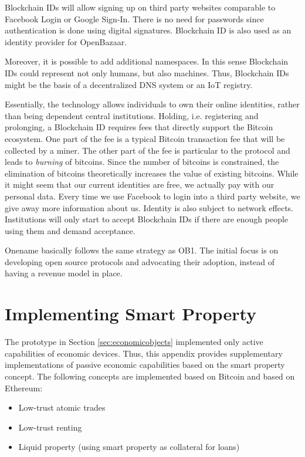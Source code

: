 Blockchain IDs will allow signing up on third party websites comparable to Facebook 
Login or Google Sign-In. There is no need for passwords since authentication is 
done using digital signatures. Blockchain ID is also used as an identity provider 
for OpenBazaar. 

Moreover, it is possible to add additional namespaces. In this sense Blockchain 
IDs could represent not only humans, but also machines. Thus, Blockchain IDs might 
be the basis of a decentralized DNS system or an IoT registry. 

Essentially, the technology allows individuals to own their online identities, 
rather than being dependent central institutions. Holding, i.e. registering and 
prolonging, a Blockchain ID requires fees that directly support the Bitcoin ecosystem. 
One part of the fee is a typical Bitcoin transaction fee that will be collected 
by a miner. The other part of the fee is particular to the protocol and leads to 
\emph{burning} of bitcoins. Since the number of bitcoins is constrained, the elimination 
of bitcoins theoretically increases the value of existing bitcoins. While it might 
seem that our current identities are free, we actually pay with our personal data. 
Every time we use Facebook to login into a third party website, we give away more 
information about us. Identity is also subject to network effects. Institutions 
will only start to accept Blockchain IDs if there are enough people using them 
and demand acceptance. 

Onename basically follows the same strategy as OB1. The initial focus is on developing 
open source protocols and advocating their adoption, instead of having a revenue 
model in place.

\newpage

\chapter{Implementing Smart Property}
\label{appendix:smartproperty}

The prototype in Section \ref{sec:economicobjects} implemented only active capabilities of economic devices. Thus, this appendix provides supplementary implementations of passive economic capabilities based on the smart property concept. The following concepts are implemented based on Bitcoin and based on Ethereum:

\begin{itemize}
	\item Low-trust atomic trades
	\item Low-trust renting
	\item Liquid property (using smart property as collateral for loans)
\end{itemize}

